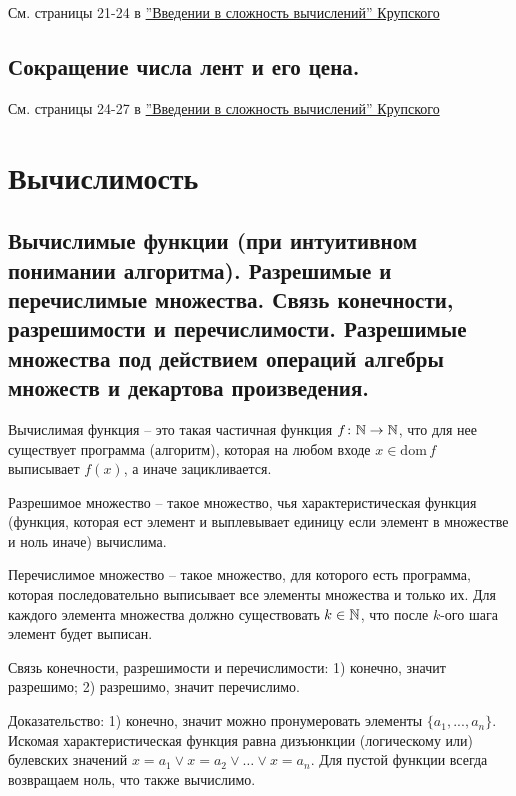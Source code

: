 \documentclass[a4paper, 10pt]{article}
\newcommand{\dom}{\text{dom}\,}
\begin{document}
См. страницы 21-24 в \href{https://static42.fileskachat.com/download/6/c/33377_672968aac1311878215538743df4fbd9.pdf}{''Введении в сложность вычислений'' Крупского}

\subsection{Сокращение числа лент и его цена.}

См. страницы 24-27 в \href{https://static42.fileskachat.com/download/6/c/33377_672968aac1311878215538743df4fbd9.pdf}{''Введении в сложность вычислений'' Крупского}

\section{Вычислимость}

\subsection{Вычислимые функции (при интуитивном понимании алгоритма). Разрешимые и перечислимые множества. Связь конечности, разрешимости и перечислимости. Разрешимые множества под действием операций алгебры множеств и декартова произведения.}

Вычислимая функция -- это такая частичная функция $f\colon\mathbb{N}\to\mathbb{N}$, что для нее существует программа (алгоритм), которая на любом входе $x\in\dom f$ выписывает $f(x)$, а иначе зацикливается.

Разрешимое множество -- такое множество, чья характеристическая функция (функция, которая ест элемент и выплевывает единицу если элемент в множестве и ноль иначе) вычислима.

Перечислимое множество -- такое множество, для которого есть программа, которая последовательно выписывает все элементы множества и только их. Для каждого элемента множества должно существовать $k\in\mathbb{N}$, что после $k$-ого шага элемент будет выписан.

\hfill

Связь конечности, разрешимости и перечислимости: 1) конечно, значит разрешимо; 2) разрешимо, значит перечислимо.

Доказательство: 1) конечно, значит можно пронумеровать элементы $\{a_1,...,a_n\}$. Искомая характеристическая функция равна дизъюнкции (логическому или) булевских значений $x=a_1\lor x=a_2 \lor \ldots \lor x=a_n$. Для пустой функции всегда возвращаем ноль, что также вычислимо.
\end{document}
